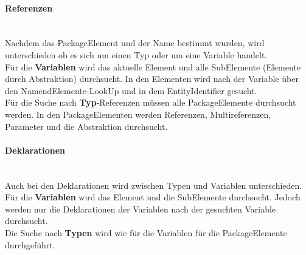 \documentclass[./einleitung.tex]{subfiles}
\begin{document}
    \paragraph{Referenzen}\mbox{}\\
    Nachdem das PackageElement und der Name bestimmt wurden, wird unterschieden ob es sich um einen Typ oder um eine Variable handelt.
    \\
    Für die \textbf{Variablen} wird das aktuelle Element und alle SubElemente (Elemente durch Abstraktion) durchsucht.
    In den Elementen wird nach der Variable über den NamendElemente-LookUp und in dem EntityIdentifier gesucht.
    \\
    Für die Suche nach \textbf{Typ}-Referenzen müssen alle PackageElemente durchsucht werden.
    In den PackageElementen werden Referenzen, Multireferenzen, Parameter und die Abstraktion durchsucht.

    \paragraph{Deklarationen}\mbox{}\\
    Auch bei den Deklarationen wird zwischen Typen und Variablen unterschieden. \\
    Für die \textbf{Variablen} wird das Element und die SubElemente durchsucht.
    Jedoch werden nur die Deklarationen der Variablen nach der gesuchten Variable durchsucht.\\
    Die Suche nach \textbf{Typen} wird wie für die Variablen für die PackageElemente durchgeführt.
\end{document}

